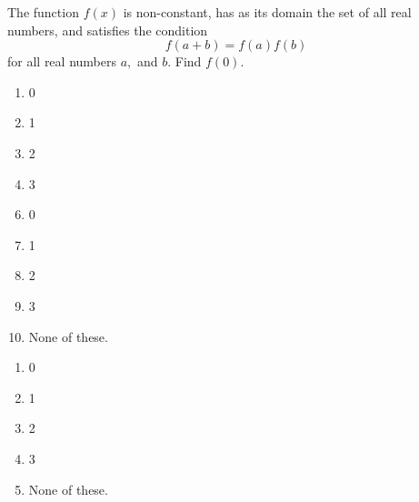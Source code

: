 The function $f(x)$ is non-constant, has as its domain the set of all real numbers, and satisfies the condition
\[f(a + b)=f(a)f(b)\]
for all real numbers $a,$ and $b$. Find $f(0)$.


\ifsat
	\begin{enumerate}[label=\Alph*)]
		\item 0
		\item 1%
		\item 2
		\item 3
	\end{enumerate}
\else
\fi

\ifacteven
	\begin{enumerate}[label=\textbf{\Alph*.},itemsep=\fill,align=left]
		\setcounter{enumii}{5}
		\item 0
		\item 1%
		\item 2
		\addtocounter{enumii}{1}
		\item 3
		\item None of these.
	\end{enumerate}
\else
\fi

\ifactodd
	\begin{enumerate}[label=\textbf{\Alph*.},itemsep=\fill,align=left]
		\item 0
		\item 1%
		\item 2
		\item 3
		\item None of these.
	\end{enumerate}
\else
\fi

%
		
\else
\fi

